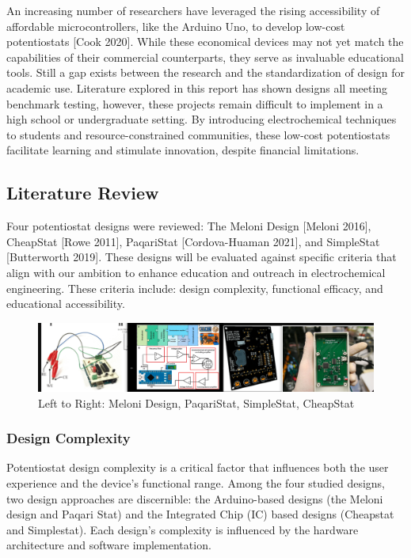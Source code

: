 \documentclass{article}
\begin{document}
An increasing number of researchers have leveraged the rising accessibility of affordable microcontrollers, like the Arduino Uno, to develop low-cost potentiostats [Cook 2020]. While these economical devices may not yet match the capabilities of their commercial counterparts, they serve as invaluable educational tools. Still a gap exists between the research and the standardization of design for academic use. Literature explored in this report has shown designs all meeting benchmark testing, however, these projects remain difficult to implement in a high school or undergraduate setting. By introducing electrochemical techniques to students and resource-constrained communities, these low-cost potentiostats facilitate learning and stimulate innovation, despite financial limitations.

\subsection*{Literature Review}
Four potentiostat designs were reviewed: The Meloni Design [Meloni 2016], CheapStat [Rowe 2011], PaqariStat [Cordova-Huaman 2021], and SimpleStat [Butterworth 2019]. These designs will be evaluated against specific criteria that align with our ambition to enhance education and outreach in electrochemical engineering. These criteria include: design complexity, functional efficacy, and educational accessibility.
\begin{figure}[H]
    \centering
    \includegraphics[width=1\linewidth]{review.png}
    \caption{Left to Right: Meloni Design, PaqariStat, SimpleStat, CheapStat}
\end{figure}
\subsubsection*{Design Complexity}
Potentiostat design complexity is a critical factor that influences both the user experience and the device's functional range. Among the four studied designs, two design approaches are discernible: the Arduino-based designs (the Meloni design and Paqari Stat) and the Integrated Chip (IC) based designs (Cheapstat and Simplestat). Each design's complexity is influenced by the hardware architecture and software implementation.
\end{document}
